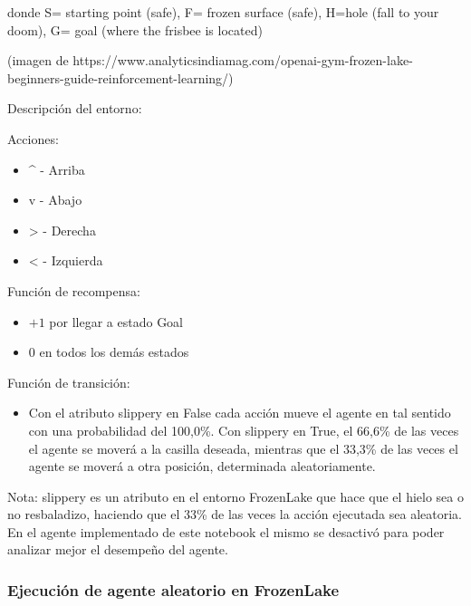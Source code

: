\documentclass[11pt]{article}
\providecommand{\tightlist}{%
      \setlength{\itemsep}{0pt}\setlength{\parskip}{0pt}}
\begin{document}
donde S= starting point (safe), F= frozen surface (safe), H=hole (fall
to your doom), G= goal (where the frisbee is located)

(imagen de
https://www.analyticsindiamag.com/openai-gym-frozen-lake-beginners-guide-reinforcement-learning/)

    Descripción del entorno:

Acciones:

\begin{itemize}
\tightlist
\item
  \^{} - Arriba
\item
  v - Abajo
\item
  \textgreater{} - Derecha
\item
  \textless{} - Izquierda
\end{itemize}

Función de recompensa:

\begin{itemize}
\tightlist
\item
  \(+1\) por llegar a estado Goal
\item
  \(0\) en todos los demás estados
\end{itemize}

Función de transición:

\begin{itemize}
\tightlist
\item
  Con el atributo slippery en False cada acción mueve el agente en tal
  sentido con una probabilidad del 100,0\%. Con slippery en True, el
  66,6\% de las veces el agente se moverá a la casilla deseada, mientras
  que el 33,3\% de las veces el agente se moverá a otra posición,
  determinada aleatoriamente.
\end{itemize}

Nota: slippery es un atributo en el entorno FrozenLake que hace que el
hielo sea o no resbaladizo, haciendo que el 33\% de las veces la acción
ejecutada sea aleatoria. En el agente implementado de este notebook el
mismo se desactivó para poder analizar mejor el desempeño del agente.

    \subsubsection{Ejecución de agente aleatorio en
FrozenLake}\label{ejecuciuxf3n-de-agente-aleatorio-en-frozenlake}
\end{document}
